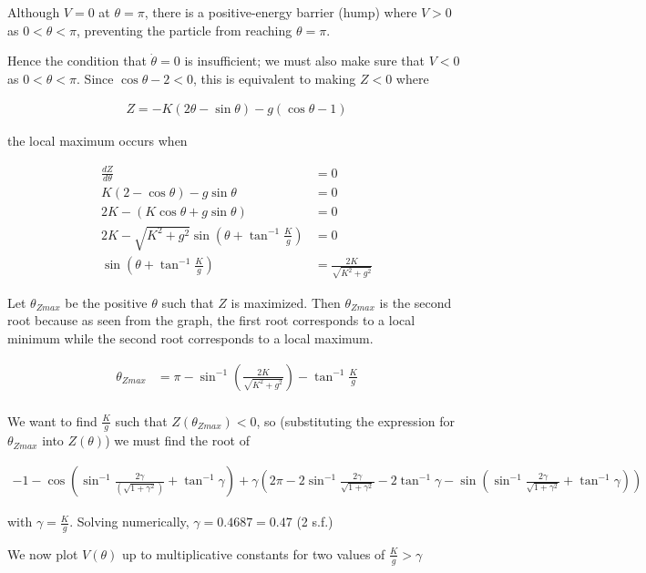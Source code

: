 \documentclass{article}
\begin{document}
Although $V = 0$ at $\theta = \pi$, there is a positive-energy barrier (hump) where $V > 0$ as $0 < \theta < \pi$, preventing the particle from reaching $\theta = \pi$.

Hence the condition that $\dot\theta = 0$ is insufficient; we must also make sure that $V < 0$ as $0 < \theta < \pi$. Since $\cos\theta - 2 < 0$, this is equivalent to making $Z < 0$ where

\begin{align*}
Z = -K(2\theta - \sin\theta) - g(\cos\theta - 1)
\end{align*}

the local maximum occurs when

\begin{align*}
\frac{dZ}{d\theta} &= 0 \\
K(2 - \cos\theta) - g\sin\theta &= 0 \\
2K - (K\cos\theta + g\sin\theta) &= 0 \\
2K - \sqrt{K^2 + g^2}\sin(\theta + \tan^{-1}\frac{K}{g}) &= 0 \\
\sin(\theta + \tan^{-1}\frac{K}{g}) &= \frac{2K}{\sqrt{K^2 + g^2}}
\end{align*}

Let $\theta_{Zmax}$ be the positive $\theta$ such that $Z$ is maximized. Then $\theta_{Zmax}$ is the second root because as seen from the graph, the first root corresponds to a local minimum while the second root corresponds to a local maximum. 

\begin{align*}
\theta_{Zmax} &= \pi - \sin^{-1}(\frac{2K}{\sqrt{K^2 + g^2}}) - \tan^{-1}\frac{K}{g}\\
\end{align*}

We want to find $\frac{K}{g}$ such that $Z(\theta_{Zmax}) < 0$, so (substituting the expression for $\theta_{Zmax}$ into $Z(\theta)$) we must find the root of

\begin{align*}
-1 - \cos\left(\sin^{-1}\frac{2\gamma}{(\sqrt{1+\gamma^2})} + \tan^{-1}\gamma\right) + \gamma\left(2\pi - 2\sin^{-1}\frac{2\gamma}{\sqrt{1+\gamma^2}} - 2\tan^{-1}\gamma - \sin(\sin^{-1}\frac{2\gamma}{\sqrt{1+\gamma^2}} + \tan^{-1}\gamma)\right)
\end{align*}

with $\gamma = \frac{K}{g}$. Solving numerically, $\gamma = 0.4687 = 0.47$ (2 s.f.)

We now plot $V(\theta)$ up to multiplicative constants for two values of $\frac{K}{g} > \gamma$
\end{document}
